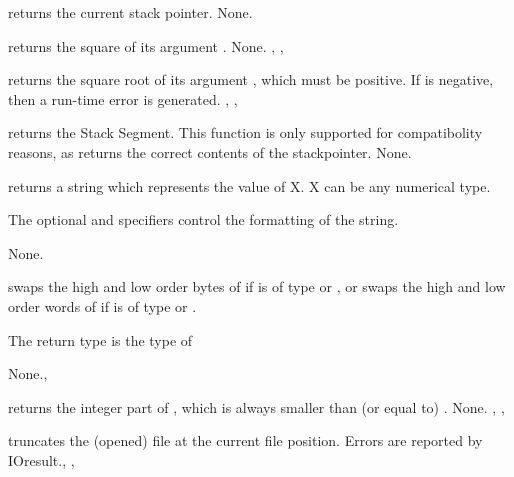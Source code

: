 \documentclass{report}
\begin{document}


{ returns the current stack pointer.
}{None.}{}



{ returns the square of its argument .}
{None.}
{, , }



{ returns the square root of its argument , which must be
positive.}
{If  is negative, then a run-time error is generated.}
{, , }



{  returns the Stack Segment. This function is only 
 supported for compatibolity reasons, as  returns the
correct contents of the stackpointer.}
{None.}{}




{ returns a string which represents the value of X. X can be any
numerical type.

The optional  and  specifiers control the
formatting of the string.}
{None.}
{}



{ swaps the high and low order bytes of  if  is of
type  or , or swaps the high and low order words of
 if  is of type  or .

The return type is the type of }
{None.}{, }



{ returns the integer part of , 
which is always smaller than (or equal to)  .}
{None.}
{, , }



{ truncates the (opened) file  at the current file
position.
}{Errors are reported by IOresult.}{, ,
}


\end{document}
